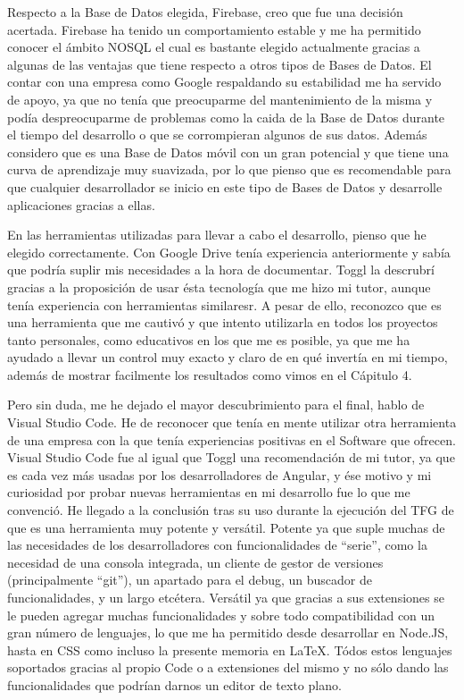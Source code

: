 \documentclass[11pt,openany]{book}
\begin{document}
Respecto a la Base de Datos elegida, Firebase, creo que fue una decisión acertada. Firebase ha tenido un comportamiento estable y me ha permitido conocer el ámbito NOSQL el cual es bastante elegido actualmente gracias a algunas de las ventajas que tiene respecto a otros tipos de Bases de Datos. El contar con una empresa como Google respaldando su estabilidad me ha servido de apoyo, ya que no tenía que preocuparme del mantenimiento de la misma y podía despreocuparme de problemas como la caida de la Base de Datos durante el tiempo del desarrollo o que se corrompieran algunos de sus datos. Además considero que es una Base de Datos móvil con un gran potencial y que tiene una curva de aprendizaje muy suavizada, por lo que pienso que es recomendable para que cualquier desarrollador se inicio en este tipo de Bases de Datos y desarrolle aplicaciones gracias a ellas.

En las herramientas utilizadas para llevar a cabo el desarrollo, pienso que he elegido correctamente. Con Google Drive tenía experiencia anteriormente y sabía que podría suplir mis necesidades a la hora de documentar. Toggl la descrubrí gracias a la proposición de usar ésta tecnología que me hizo mi tutor, aunque tenía experiencia con herramientas similaresr. A pesar de ello, reconozco que es una herramienta que me cautivó y que intento utilizarla en todos los proyectos tanto personales, como educativos en los que me es posible, ya que me ha ayudado a llevar un control muy exacto y claro de en qué invertía en mi tiempo, además de mostrar facilmente los resultados como vimos en el Cápitulo 4.

Pero sin duda, me he dejado el mayor descubrimiento para el final, hablo de Visual Studio Code. He de reconocer que tenía en mente utilizar otra herramienta de una empresa con la que tenía experiencias positivas en el Software que ofrecen. Visual Studio Code fue al igual que Toggl una recomendación de mi tutor, ya que es cada vez más usadas por los desarrolladores de Angular, y ése motivo y mi curiosidad por probar nuevas herramientas en mi desarrollo fue lo que me convenció. He llegado a la conclusión tras su uso durante la ejecución del TFG de que es una herramienta muy potente y versátil. Potente ya que suple muchas de las necesidades de los desarrolladores con funcionalidades de ``serie'', como la necesidad de una consola integrada, un cliente de gestor de versiones (principalmente ``git''), un apartado para el debug, un buscador de funcionalidades, y un largo etcétera. Versátil ya que gracias a sus extensiones se le pueden agregar muchas funcionalidades y sobre todo compatibilidad con un gran número de lenguajes, lo que me ha permitido desde desarrollar en Node.JS, hasta en CSS como incluso la presente memoria en LaTeX. Tódos estos lenguajes soportados gracias al propio Code o a extensiones del mismo y no sólo dando las funcionalidades que podrían darnos un editor de texto plano.
\end{document}
